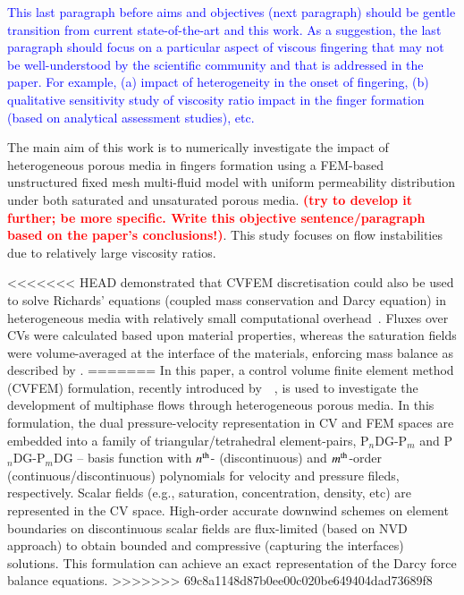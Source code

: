 \documentclass[preprint,authoryear,12pt]{elsarticle}
\newcommand{\red}{\textcolor{red}}
\newcommand{\blue}{\textcolor{blue}}
\newcommand{\PN}[2][error]{P$_{#1}$DG-P$_{#2}$}
\newcommand{\PNDG}[2][error]{P$_{#1}$DG-P$_{#2}$DG}
\begin{document}
\blue{This last paragraph before aims and objectives (next paragraph) should be gentle transition from current state-of-the-art and this work. As a suggestion, the last paragraph should focus on a particular aspect of viscous fingering that may not be well-understood by the scientific community and that is addressed in the paper. For example, (a) impact of heterogeneity in the onset of fingering, (b) qualitative sensitivity study of viscosity ratio impact in the finger formation (based on analytical assessment studies), etc.} 

The main aim of this work is to numerically investigate the impact of heterogeneous porous media in fingers formation using a FEM-based unstructured fixed mesh multi-fluid model with uniform permeability distribution under both saturated and unsaturated porous media. \red{\bf (try to develop it further; be more specific. Write this objective sentence/paragraph based on the paper's conclusions!)}. This study focuses on flow instabilities due to relatively large viscosity ratios.  

<<<<<<< HEAD
\citet{cumming_2011} demonstrated that CVFEM discretisation could also be used to solve Richards' equations (coupled mass conservation and Darcy equation) in heterogeneous media with relatively small computational overhead~\citep[compared with traditional coupled velocity-pressure based formulations, see also][]{cumming_phd2012}. Fluxes over CVs were calculated based upon material properties, whereas the saturation fields were volume-averaged at the interface of the materials, enforcing mass balance as described by \citet{kirkland_1992}.
=======
In this paper, a control volume finite element method (CVFEM) formulation, recently introduced by~\citet{jackson_2015}~\citep[see also][]{radunz_2014}, is used to investigate the development of multiphase flows through heterogeneous porous media. In this formulation, the dual pressure-velocity representation in CV and FEM spaces are embedded into a family of triangular/tetrahedral element-pairs, \PN[n]{m} and \PNDG[n]{m} \citep[][]{cotter_2009b,xie_2014} -- basis function with $n^{\rm th}$- (discontinuous) and $m^{\rm th}$-order (continuous/discontinuous) polynomials for velocity and pressure fileds, respectively.  Scalar fields (e.g., saturation, concentration, density, etc) are represented in the CV space. High-order accurate downwind schemes on element boundaries on discontinuous scalar fields are flux-limited (based on NVD approach) to obtain bounded and compressive (capturing the interfaces) solutions. This formulation can achieve an exact representation of the Darcy force balance equations.
>>>>>>> 69c8a1148d87b0ee00c020be649404dad73689f8
\end{document}
